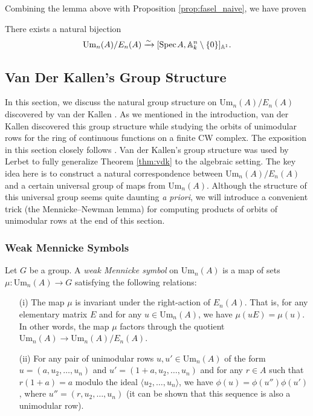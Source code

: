 Combining the lemma above with Proposition \ref{prop:fasel_naive}, we have proven

\begin{corollary}
    There exists a natural bijection \[\mathrm{Um}_n(A)/E_n(A) \xrightarrow{\sim} [\text{Spec}\hspace{0.1em} A, \mathbb{A}^n_k\setminus \{0\}]_{\mathbb{A}^1}.\] 
\end{corollary}

\subsection{Van Der Kallen's Group Structure}\label{sec:group_structure}

In this section, we discuss the natural group structure on $\mathrm{Um}_n(A)/E_n(A)$ discovered by van der Kallen \cite{vdk}. As we mentioned in the introduction, van der Kallen discovered this group structure while studying the orbits of unimodular rows for the ring of continuous functions on a finite CW complex. The exposition in this section closely follows \cite[Section 3]{LERBET2024109415}. Van der Kallen's group structure was used by Lerbet to fully generalize Theorem \ref{thm:vdk} to the algebraic setting. The key idea here is to construct a natural correspondence between $\mathrm{Um}_n(A)/E_n(A)$ and a certain universal group of maps from $\mathrm{Um}_n(A)$. Although the structure of this universal group seems quite daunting \textit{a priori}, we will introduce a convenient trick (the Mennicke--Newman lemma) for computing products of orbits of unimodular rows at the end of this section.

\subsubsection{Weak Mennicke Symbols}

\begin{definition}\label{def:wms}
    Let $G$ be a group. A \textit{weak Mennicke symbol} on $\mathrm{Um}_n(A)$ is a map of sets $\mu\colon \mathrm{Um}_n(A) \to G$ satisfying the following relations:
    \begin{itemize}
        \item[(i)] The map $\mu$ is invariant under the right-action of $E_n(A)$. That is, for any elementary matrix $E$ and for any $u \in \mathrm{Um}_n(A)$, we have $\mu(uE) = \mu(u)$. In other words, the map $\mu$ factors through the quotient $\mathrm{Um}_n(A) \to \mathrm{Um}_n(A)/E_n(A)$. 
        \item[(ii)] For any pair of unimodular rows $u,u' \in \mathrm{Um}_n(A)$ of the form $u = (a,u_2,\ldots,u_n)$ and $u' = (1+a,u_2,\ldots,u_n)$ and for any $r \in A$ such that $r(1 + a) = a$ modulo the ideal $\langle u_2,\ldots,u_n\rangle$, we have $\phi(u) = \phi(u'')\phi(u')$, where $u'' = (r,u_2,\ldots,u_n)$ (it can be shown that this sequence is also a unimodular row). 
    \end{itemize}
\end{definition}

